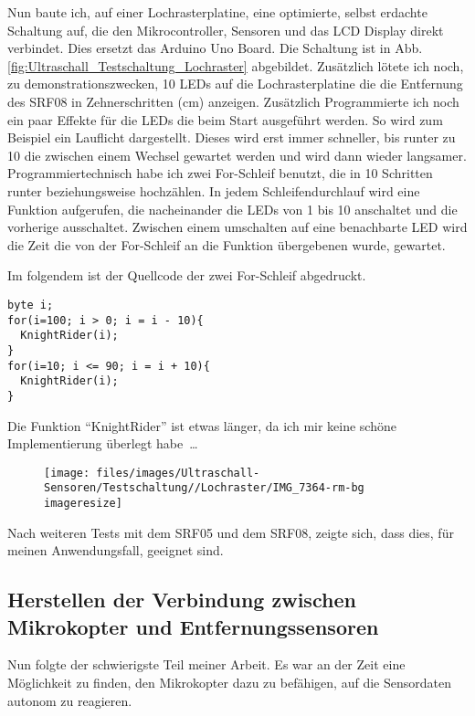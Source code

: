 Nun baute ich, auf einer Lochrasterplatine,
eine optimierte, selbst erdachte Schaltung auf,
die den Mikrocontroller, Sensoren und das \ac{LCD} Display direkt verbindet.
Dies ersetzt das Arduino Uno Board.
Die Schaltung ist in Abb. \vref{fig:Ultraschall_Testschaltung_Lochraster} abgebildet.
Zusätzlich lötete ich noch, zu demonstrationszwecken,
10 \acs{LED}s auf die Lochrasterplatine
die die Entfernung des SRF08 in Zehnerschritten (\si{\centi\metre})
anzeigen.
Zusätzlich Programmierte ich noch ein paar Effekte
für die \acs{LED}s die beim Start ausgeführt werden.
So wird zum Beispiel ein Lauflicht dargestellt.
Dieses wird erst immer schneller, bis runter zu \unit{10}{\milli\second}
die zwischen einem Wechsel gewartet werden
und wird dann wieder langsamer.
Programmiertechnisch habe ich zwei For-Schleif benutzt,
die in \unit{10}{\milli\second} Schritten runter
beziehungsweise hochzählen.
In jedem Schleifendurchlauf wird eine Funktion aufgerufen,
die nacheinander die LEDs von 1 bis 10 anschaltet und die vorherige ausschaltet.
Zwischen einem umschalten auf eine benachbarte LED wird die Zeit die von der
For-Schleif an die Funktion übergebenen wurde, gewartet.

Im folgendem ist der Quellcode der zwei For-Schleif abgedruckt.

\lstset{language=C}
\begin{lstlisting}
byte i;
for(i=100; i > 0; i = i - 10){
  KnightRider(i);
}
for(i=10; i <= 90; i = i + 10){
  KnightRider(i);
}
\end{lstlisting}

Die Funktion \enquote{KnightRider} ist etwas länger, da ich mir keine schöne Implementierung
überlegt habe~\dots

\begin{figure}\centering
        \texttt{[image: files/images/Ultraschall-Sensoren/Testschaltung//Lochraster/IMG\_7364-rm-bg\\imageresize]}
        \label{fig:Ultraschall_Testschaltung_Lochraster}
\end{figure}

Nach weiteren Tests mit dem SRF05 und dem SRF08, zeigte sich,
dass dies, für meinen Anwendungsfall, geeignet sind.

\subsection{Herstellen der Verbindung zwischen Mikrokopter und Entfernungssensoren}
Nun folgte der schwierigste Teil meiner Arbeit.
Es war an der Zeit eine Möglichkeit zu finden,
den Mikrokopter dazu zu befähigen,
auf die Sensordaten autonom zu reagieren.

